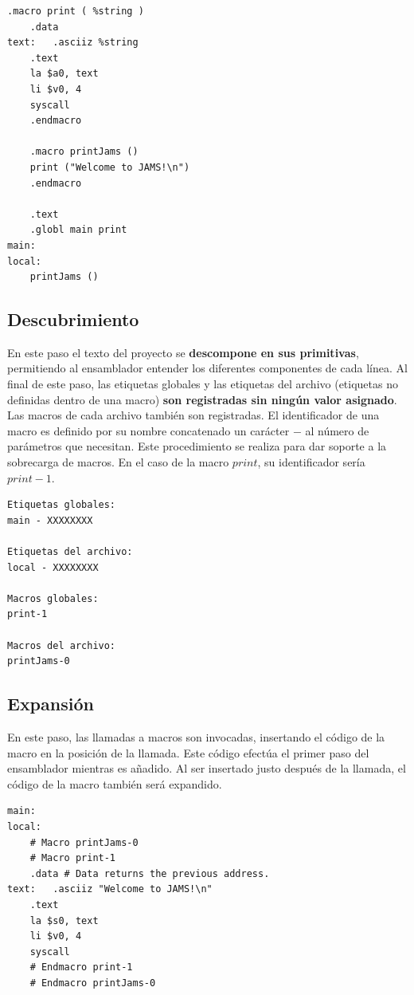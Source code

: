 \begin{lstlisting}[frame=single,label={lst:example.asm}]
    .macro print ( %string )
    .data
text:   .asciiz %string
    .text
    la $a0, text
    li $v0, 4
    syscall
    .endmacro

    .macro printJams ()
    print ("Welcome to JAMS!\n")
    .endmacro

    .text
    .globl main print
main:
local:
    printJams ()
\end{lstlisting}

\subsection{Descubrimiento}\label{subsec:descubrimiento}

En este paso el texto del proyecto se \textbf{descompone en sus primitivas},
permitiendo al ensamblador entender los diferentes componentes de cada línea.
Al final de este paso, las etiquetas globales y las etiquetas del archivo
(etiquetas no definidas dentro de una macro) \textbf{son registradas sin
ningún valor asignado}.
Las macros de cada archivo también son registradas.
El identificador de una macro es definido por su nombre concatenado
un carácter $-$ al número de parámetros que necesitan.
Este procedimiento se realiza para dar soporte a la sobrecarga de macros.
En el caso de la macro $print$, su identificador sería $print-1$.

\begin{lstlisting}[frame=single,label={lst:descubrimiento}]
Etiquetas globales:
main - XXXXXXXX

Etiquetas del archivo:
local - XXXXXXXX

Macros globales:
print-1

Macros del archivo:
printJams-0
\end{lstlisting}

\subsection{Expansión}\label{subsec:expansion}

En este paso, las llamadas a macros son invocadas,
insertando el código de la macro en la posición de la llamada.
Este código efectúa el primer paso del ensamblador mientras es añadido.
Al ser insertado justo después de la llamada, el código de la macro
también será expandido.

\begin{lstlisting}[frame=single,label={lst:expansion}]
main:
local:
    # Macro printJams-0
    # Macro print-1
    .data # Data returns the previous address.
text:   .asciiz "Welcome to JAMS!\n"
    .text
    la $s0, text
    li $v0, 4
    syscall
    # Endmacro print-1
    # Endmacro printJams-0
\end{lstlisting}

